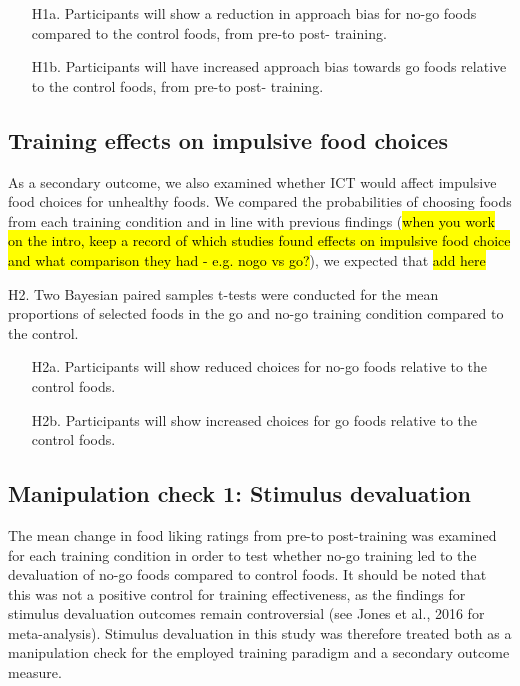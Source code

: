 \documentclass[man,floatsintext]{apa6}
\begin{document}
\begin{itemize}
\item[H1a.] Participants will show a reduction in approach bias for no-go foods compared to the control foods, from pre-to post- training.
\item[H1b.] Participants will have increased approach bias towards go foods relative to the control foods, from pre-to post- training.
\end{itemize}

\subsection{Training effects on impulsive food
choices}\label{training-effects-on-impulsive-food-choices}

As a secondary outcome, we also examined whether ICT would affect
impulsive food choices for unhealthy foods. We compared the
probabilities of choosing foods from each training condition and in line
with previous findings
(\hl{when you work on the intro, keep a record of which studies found effects on impulsive food choice and what comparison they had - e.g. nogo vs go?}),
we expected that \hl{add here}

\noindent H2. Two Bayesian paired samples t-tests were conducted for the
mean proportions of selected foods in the go and no-go training
condition compared to the control.

\begin{itemize}
\item[H2a.] Participants will show reduced choices for no-go foods relative to the control foods.
\item[H2b.] Participants will show increased choices for go foods relative to the control foods.
\end{itemize}

\subsection{Manipulation check 1: Stimulus
devaluation}\label{manipulation-check-1-stimulus-devaluation}

The mean change in food liking ratings from pre-to post-training was
examined for each training condition in order to test whether no-go
training led to the devaluation of no-go foods compared to control
foods. It should be noted that this was not a positive control for
training effectiveness, as the findings for stimulus devaluation
outcomes remain controversial (see Jones et al., 2016 for
meta-analysis). Stimulus devaluation in this study was therefore treated
both as a manipulation check for the employed training paradigm and a
secondary outcome measure.
\end{document}
